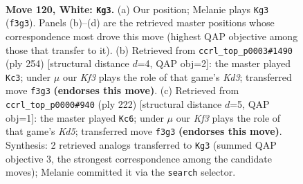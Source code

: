 \documentclass[11pt]{article}
\begin{document}
\begin{figure}[p]\centering
\begin{subfigure}{0.46\textwidth}\centering
\resizebox{\linewidth}{!}{%
\newchessgame
\chessboard[
  setfen={4k3/8/8/8/8/5K2/6Q1/8 w - - 19 120},
  showmover=false,
  pgfstyle=straightmove, color=movearrow, markmove={f3-g3}
]}
\caption{}
\end{subfigure}\hfill
\begin{subfigure}{0.46\textwidth}\centering
\resizebox{\linewidth}{!}{%
\newchessgame
\chessboard[
  setfen={8/8/8/8/3Q4/3K4/6r1/1k6 w - - 31 128},
  showmover=false,
  pgfstyle=straightmove, color=movearrow, markmove={d3-c3}
]}
\caption{}
\end{subfigure}
\\[4pt]
\begin{subfigure}{0.46\textwidth}\centering
\resizebox{\linewidth}{!}{%
\newchessgame
\chessboard[
  setfen={k7/8/8/1Q1K4/8/8/8/8 w - - 9 112},
  showmover=false,
  pgfstyle=straightmove, color=movearrow, markmove={d5-c6}
]}
\caption{}
\end{subfigure}\hfill

\caption{\textbf{Move 120, White: \texttt{Kg3}.} (a) Our position; Melanie plays \texttt{Kg3} (\texttt{f3g3}). Panels (b)--(d) are the retrieved master positions whose correspondence most drove this move (highest QAP objective among those that transfer to it). (b) Retrieved from \texttt{ccrl\_top\_p0003\#1490} (ply 254) [structural distance $d$=4, QAP obj=2]: the master played \texttt{Kc3}; under $\mu$ our \emph{Kf3} plays the role of that game's \emph{Kd3}; transferred move \texttt{f3g3} \textbf{(endorses this move)}. (c) Retrieved from \texttt{ccrl\_top\_p0000\#940} (ply 222) [structural distance $d$=5, QAP obj=1]: the master played \texttt{Kc6}; under $\mu$ our \emph{Kf3} plays the role of that game's \emph{Kd5}; transferred move \texttt{f3g3} \textbf{(endorses this move)}. Synthesis: 2 retrieved analogs transferred to \texttt{Kg3} (summed QAP objective 3, the strongest correspondence among the candidate moves); Melanie committed it via the \texttt{search} selector.}
\label{fig:thought-m238}
\end{figure}

\clearpage
\end{document}
